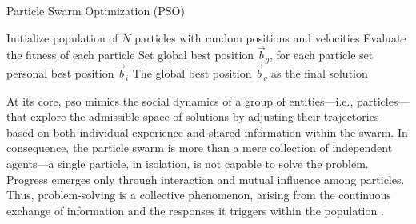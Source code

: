 {\begin{algorithm}[H]
\caption{Particle Swarm Optimization (PSO)}\label{alg:pso}
Initialize population of \(N\) particles with random positions and velocities\;
Evaluate the fitness of each particle\;
Set global best position \(\vec{b}_g\), for each particle set personal best position \(\vec{b}_i\)\;
\Return The global best position \(\vec{b}_g\) as the final solution\;
\end{algorithm}

\vspace{.935em}

At its core, \acrshort{pso} mimics the social dynamics of a group of entities---i.e., particles---that explore the admissible space of solutions by adjusting their trajectories  based on both individual experience and shared information within the swarm. In consequence, the particle swarm is more than a mere collection of independent agents---a single particle, in isolation, is not capable to solve the problem. Progress emerges only through interaction and mutual influence among particles. Thus, problem-solving is a collective phenomenon, arising from the continuous exchange of information and the responses it triggers within the population \citep{poli2007particle}.



}
